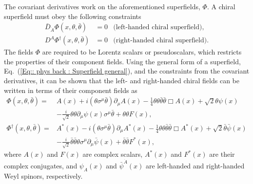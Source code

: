 \documentclass[twoside,english]{uiofysmaster}
\begin{document}
The covariant derivatives work on the aforementioned superfields, $\Phi$. A chiral superfield must obey the following constraints
\begin{align}
\bar{D}_{\dot{A}} \Phi (x, \theta, \bar{\theta}) &= 0 &\text{(left-handed chiral superfield)},\\
D^A \Phi^{\dagger} (x, \theta, \bar{\theta}) &= 0 &\text{(right-handed chiral superfield)}.
\end{align}
The fields $\Phi$ are required to be Lorentz scalars or pseudoscalars, which restricts the properties of their component fields. Using the general form of a superfield, Eq.~(\ref{Eq:: phys back : Superfield general}), and the constraints from the covariant derivatives, it can be shown that the left- and right-handed chiral fields can be written in terms of their component fields as  \cite{batzing2017lecture}
\begin{align}
\Phi (x, \theta, \bar{\theta}) =& A(x) + i (\theta \sigma^{\mu} \bar{\theta}) \partial_{\mu} A(x) - \frac{1}{4} \theta \theta \bar{\theta} \bar{\theta} \Box A(x) + \sqrt{2} \theta \psi (x)\nonumber \\ 
& - \frac{i}{\sqrt{2}} \theta \theta \partial_{\mu} \psi (x) \sigma^{\mu} \bar{\theta} + \theta \theta F(x),\\
\Phi^{\dagger} (x, \theta, \bar{\theta}) =& A^*(x) - i (\theta \sigma^{\mu} \bar{\theta}) \partial_{\mu} A^*(x) - \frac{1}{4} \theta \theta \bar{\theta} \bar{\theta} \Box A^*(x) + \sqrt{2} \bar{\theta} \bar{\psi} (x)\nonumber \\
& - \frac{i}{\sqrt{2}} \bar{\theta} \bar{\theta} \theta \sigma^{\mu} \partial_{\mu} \bar{\psi} (x)  + \bar{\theta} \bar{\theta} F^*(x),
\end{align}
where $A(x)$ and $F(x)$ are complex scalars, $A^*(x)$ and $F^*(x)$ are their complex conjugates, and $\psi_A(x)$ and $\bar{\psi}^{\dot{A}} (x)$ are left-handed and right-handed Weyl spinors, respectively. 
\end{document}
